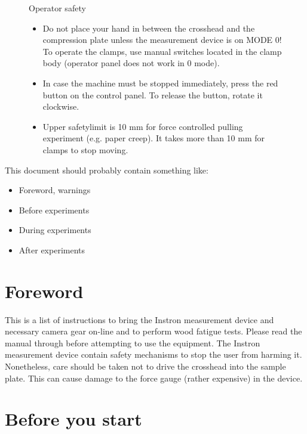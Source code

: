 \documentclass[a4paper]{article}
\begin{document}
\begin{figure}[htb]
  \begin{minipage}[\textwidth]{\textwidth}
    {\color{red}
     {\Large Operator safety}
     \begin{itemize}
       \item Do not place your hand in between the crosshead and the compression plate unless the measurement device is on \textsf{MODE 0}! To operate the clamps, use manual switches located in the clamp body (operator panel does not work in 0 mode).
       \item In case the machine must be stopped immediately, press the red button on the control panel. To release the button, rotate it clockwise.
  		\item Upper safetylimit is 10 mm for force controlled pulling experiment (e.g. paper creep). It takes more than 10 mm for clamps to stop moving.    
	\end{itemize}
     }
  \end{minipage}
\end{figure}

\begin{framed}
This document should probably contain something like:
\begin{itemize}
  \item Foreword, warnings
  \item Before experiments
  \item During experiments
  \item After experiments
\end{itemize}
\end{framed}


\section{Foreword}

This is a list of instructions to bring the Instron measurement device
and necessary camera gear on-line and to perform wood fatigue
tests. Please read the manual through before attempting to use the
equipment. The Instron measurement device contain safety mechanisms to
stop the user from harming it. Nonetheless, care should be taken not
to drive the crosshead into the sample plate. This can cause damage to
the force gauge (rather expensive) in the device.

\section{Before you start}
\end{document}
